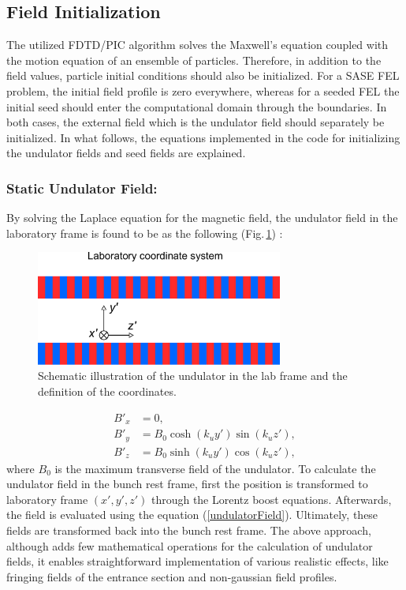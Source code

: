 \subsection{Field Initialization}
\label{fieldInitialization}

The utilized FDTD/PIC algorithm solves the Maxwell's equation coupled with the motion equation of an ensemble of particles.
%
Therefore, in addition to the field values, particle initial conditions should also be initialized.
%
For a SASE FEL problem, the initial field profile is zero everywhere, whereas for a seeded FEL the initial seed should enter the computational domain through the boundaries.
%
In both cases, the external field which is the undulator field should separately be initialized.
%
In what follows, the equations implemented in the code for initializing the undulator fields and seed fields are explained.

\subsubsection{Static Undulator Field:}

By solving the Laplace equation for the magnetic field, the undulator field in the laboratory frame is found to be as the following (Fig.\,\ref{FDTDPICFig3}) \cite{FEL2}:
%
\begin{figure}
\centering
\includegraphics[width=3.2in]{./MITHRA_FDTDPIC/Fig3/Fig3.pdf}
\caption{Schematic illustration of the undulator in the lab frame and the definition of the coordinates.}
\label{FDTDPICFig3}
\end{figure}
%
\begin{align}
\label{undulatorField}
B'_x & = 0, \nonumber \\
B'_y & = B_0 \cosh(k_uy')\sin(k_uz'), \\
B'_z & = B_0 \sinh(k_uy')\cos(k_uz'), \nonumber
\end{align}
%
where $B_0$ is the maximum transverse field of the undulator.
%
To calculate the undulator field in the bunch rest frame, first the position is transformed to laboratory frame $(x',y',z')$ through the Lorentz boost equations.
%
Afterwards, the field is evaluated using the equation (\ref{undulatorField}).
%
Ultimately, these fields are transformed back into the bunch rest frame.
%
The above approach, although adds few mathematical operations for the calculation of undulator fields, it enables straightforward implementation of various realistic effects, like fringing fields of the entrance section and non-gaussian field profiles.


